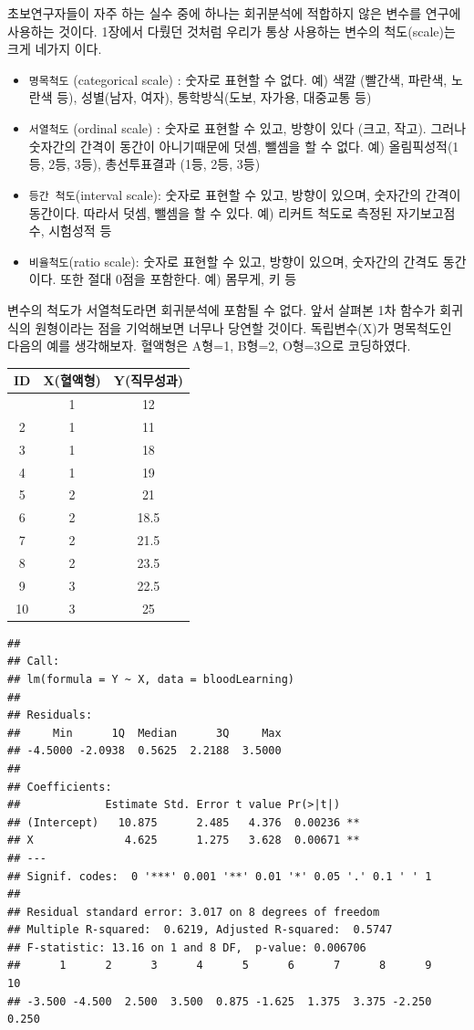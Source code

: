 \documentclass[
]{book}
\providecommand{\tightlist}{%
  \setlength{\itemsep}{0pt}\setlength{\parskip}{0pt}}
\begin{document}
초보연구자들이 자주 하는 실수 중에 하나는 회귀분석에 적합하지 않은 변수를 연구에 사용하는 것이다. 1장에서 다뤘던 것처럼 우리가 통상 사용하는 변수의 척도(scale)는 크게 네가지 이다.

\begin{itemize}
\tightlist
\item
  \texttt{명목척도} (categorical scale) : 숫자로 표현할 수 없다. 예) 색깔 (빨간색, 파란색, 노란색 등), 성별(남자, 여자), 통학방식(도보, 자가용, 대중교통 등)
\item
  \texttt{서열척도} (ordinal scale) : 숫자로 표현할 수 있고, 방향이 있다 (크고, 작고). 그러나 숫자간의 간격이 동간이 아니기때문에 덧셈, 뺄셈을 할 수 없다. 예) 올림픽성적(1등, 2등, 3등), 총선투표결과 (1등, 2등, 3등)
\item
  \texttt{등간\ 척도}(interval scale): 숫자로 표현할 수 있고, 방향이 있으며, 숫자간의 간격이 동간이다. 따라서 덧셈, 뺄셈을 할 수 있다. 예) 리커트 척도로 측정된 자기보고점수, 시험성적 등
\item
  \texttt{비율척도}(ratio scale): 숫자로 표현할 수 있고, 방향이 있으며, 숫자간의 간격도 동간이다. 또한 절대 0점을 포함한다. 예) 몸무게, 키 등
\end{itemize}

변수의 척도가 서열척도라면 회귀분석에 포함될 수 없다. 앞서 살펴본 1차 함수가 회귀식의 원형이라는 점을 기억해보면 너무나 당연할 것이다. 독립변수(X)가 명목척도인 다음의 예를 생각해보자. 혈액형은 A형=1, B형=2, O형=3으로 코딩하였다.

\begin{longtable}[]{@{}ccc@{}}
\toprule\noalign{}
ID & X(혈액형) & Y(직무성과) \\
\midrule\noalign{}
\endhead
\bottomrule\noalign{}
\endlastfoot
1 & 1 & 12 \\
2 & 1 & 11 \\
3 & 1 & 18 \\
4 & 1 & 19 \\
5 & 2 & 21 \\
6 & 2 & 18.5 \\
7 & 2 & 21.5 \\
8 & 2 & 23.5 \\
9 & 3 & 22.5 \\
10 & 3 & 25 \\
\end{longtable}

\begin{verbatim}
## 
## Call:
## lm(formula = Y ~ X, data = bloodLearning)
## 
## Residuals:
##     Min      1Q  Median      3Q     Max 
## -4.5000 -2.0938  0.5625  2.2188  3.5000 
## 
## Coefficients:
##             Estimate Std. Error t value Pr(>|t|)   
## (Intercept)   10.875      2.485   4.376  0.00236 **
## X              4.625      1.275   3.628  0.00671 **
## ---
## Signif. codes:  0 '***' 0.001 '**' 0.01 '*' 0.05 '.' 0.1 ' ' 1
## 
## Residual standard error: 3.017 on 8 degrees of freedom
## Multiple R-squared:  0.6219, Adjusted R-squared:  0.5747 
## F-statistic: 13.16 on 1 and 8 DF,  p-value: 0.006706
##      1      2      3      4      5      6      7      8      9     10 
## -3.500 -4.500  2.500  3.500  0.875 -1.625  1.375  3.375 -2.250  0.250
\end{verbatim}
\end{document}
